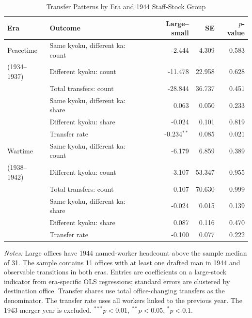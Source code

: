 \begin{table}[htbp]
\centering
\caption{Transfer Patterns by Era and 1944 Staff-Stock Group}
\label{tab:stock-groups}
\small
\begin{threeparttable}
\begin{tabular}{llrrr}
\toprule
Era & Outcome & Large--small & SE & $p$-value \\
\midrule
Peacetime & Same kyoku, different ka: count & -2.444 & 4.309 & 0.583 \\
(1934--1937) & Different kyoku: count & -11.478 & 22.958 & 0.628 \\
& Total transfers: count & -28.844 & 36.737 & 0.451 \\
& Same kyoku, different ka: share & 0.063 & 0.050 & 0.233 \\
& Different kyoku: share & -0.024 & 0.101 & 0.819 \\
& Transfer rate & -0.234$^{**}$ & 0.085 & 0.021 \\
\addlinespace
Wartime & Same kyoku, different ka: count & -6.179 & 6.859 & 0.389 \\
(1938--1942) & Different kyoku: count & -3.107 & 53.347 & 0.955 \\
& Total transfers: count & 0.107 & 70.630 & 0.999 \\
& Same kyoku, different ka: share & -0.024 & 0.015 & 0.139 \\
& Different kyoku: share & 0.087 & 0.116 & 0.470 \\
& Transfer rate & -0.100 & 0.077 & 0.222 \\
\bottomrule
\end{tabular}
\begin{tablenotes}[flushleft]\footnotesize
\item \textit{Notes:} Large offices have 1944 named-worker headcount above the sample median of 31. The sample contains 11 offices with at least one drafted man in 1944 and observable transitions in both eras. Entries are coefficients on a large-stock indicator from era-specific OLS regressions; standard errors are clustered by destination office. Transfer shares use total office-changing transfers as the denominator. The transfer rate uses all workers linked to the previous year. The 1943 merger year is excluded. $^{***}p<0.01$, $^{**}p<0.05$, $^{*}p<0.1$.
\end{tablenotes}
\end{threeparttable}
\end{table}
